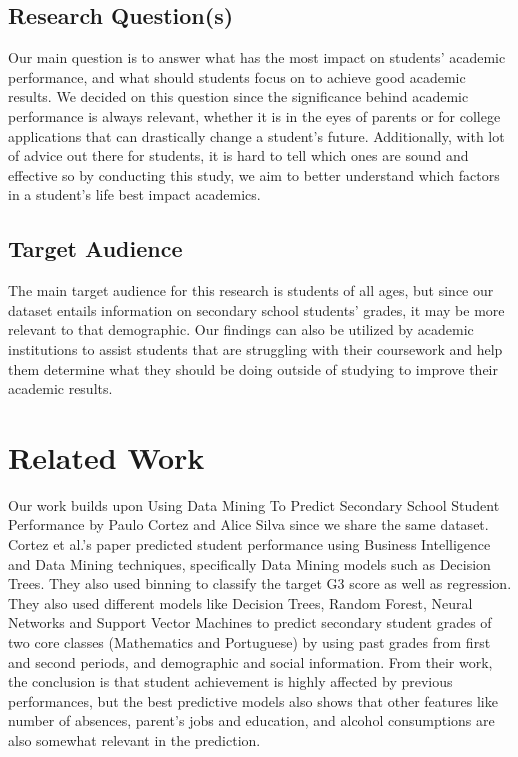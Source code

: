 \documentclass[11pt,a4paper]{article}
\begin{document}
\subsection{Research Question(s)}
Our main question is to answer what has the most impact on students' academic performance, and what should students focus on to achieve good academic results. We decided on this question since the significance behind academic performance is always relevant, whether it is in the eyes of parents or for college applications that can drastically change a student's future. Additionally, with lot of advice out there for students, it is hard to tell which ones are sound and effective so by conducting this study, we aim to better understand which factors in a student’s life best impact academics.

\subsection{Target Audience}
The main target audience for this research is students of all ages, but since our dataset entails information on secondary school students' grades, it may be more relevant to that demographic. Our findings can also be utilized by academic institutions to assist students that are struggling with their coursework and help them determine what they should be doing outside of studying to improve their academic results.

\section{Related Work}
Our work builds upon Using Data Mining To Predict Secondary School Student Performance by Paulo Cortez and Alice Silva \cite{cortez2008using} since we share the same dataset. Cortez et al.'s paper predicted student performance using Business Intelligence and Data Mining techniques, specifically Data Mining models such as Decision Trees. They also used binning to classify the target G3 score as well as regression. They also used different models like Decision Trees, Random Forest, Neural Networks and Support Vector Machines to predict secondary student grades of two core classes (Mathematics and Portuguese) by using past grades from first and second periods, and demographic and social information. From their work, the conclusion is that student achievement is highly affected by previous performances, but the best predictive models also shows that other features like number of absences, parent's jobs and education, and alcohol consumptions are also somewhat relevant in the prediction.
\end{document}
